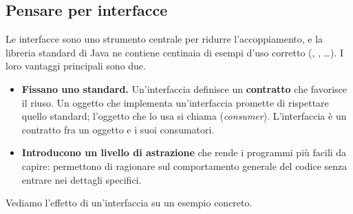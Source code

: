 \subsection{Pensare per interfacce}

Le interfacce sono uno strumento centrale per ridurre l'accoppiamento, e la libreria standard di Java ne contiene centinaia
di esempi d'uso corretto (, , \ldots). I loro vantaggi principali sono due.
\begin{itemize}
  \item \textbf{Fissano uno standard.} Un'interfaccia definisce un \textbf{contratto} che favorisce il riuso. Un oggetto che
        implementa un'interfaccia promette di rispettare quello standard; l'oggetto che lo usa si chiama
         (\textit{consumer}). L'interfaccia è un contratto fra un oggetto e i suoi consumatori.
  \item \textbf{Introducono un livello di astrazione} che rende i programmi più facili da capire: permettono di ragionare
        sul comportamento generale del codice senza entrare nei dettagli specifici.
\end{itemize}

Vediamo l'effetto di un'interfaccia su un esempio concreto.

